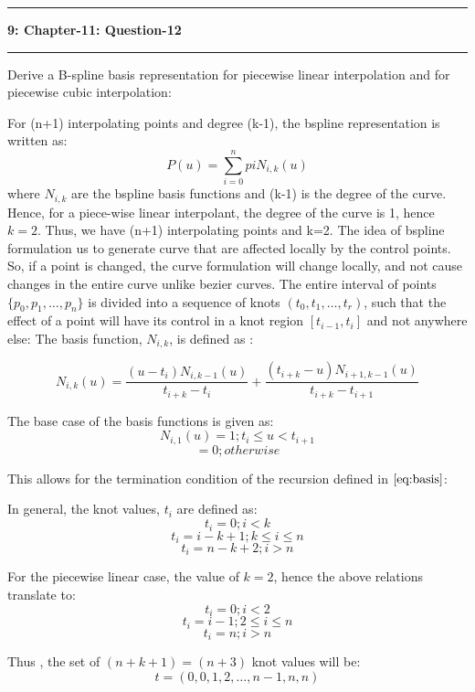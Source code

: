 \documentclass{article}
\newcommand\question[2]{\vspace{.25in}\hrule\textbf{#1: #2}\hrule\vspace{.10in}}
\begin{document}
 \question{9}{Chapter-11: Question-12}
Derive a B-spline basis representation for piecewise linear interpolation and for piecewise cubic interpolation: \newline

For (n+1) interpolating  points and degree (k-1), the bspline representation is written as: \newline
\begin{equation}
  P(u) = \sum_{i=0}^n pi N_{i,k}(u)
  \label{eq:bsum}
\end{equation}
 where $N_{i,k}$ are the bspline basis functions and (k-1) is the degree of the curve. Hence, for a piece-wise linear interpolant, the degree of the curve is 1, hence $k=2$. Thus, we have (n+1) interpolating points and k=2. \newline
The idea of bspline formulation us to  generate curve that are affected locally by the control points. So, if a point is changed, the curve formulation will change locally, and not cause changes in the entire curve unlike bezier curves. The entire interval of points $\{ p_0, p_1, \dots, p_n\}$ is divided into a sequence of knots $(t_0, t_1, \dots, t_r)$, such that the effect of a point will have its control in a knot region $[t_{i-1}, t_i]$ and not anywhere else: \newline
The basis function, $N_{i,k}$, is defined as :\newline

\begin{equation}
   N_{i,k}(u) = \dfrac{(u - t_i) N_{i,k-1}(u)}{t_{i+k} - t_i} + \dfrac{(t_{i+k} - u)N_{i+1,k-1}(u)}{t_{i+k} - t_{i+1}}
  \label{eq:basis}
\end{equation}

The base case of the basis functions is given as:
\[ N_{i,1}(u) = 1; t_i \leq u < t_{i+1}\]
\[ = 0 ; otherwise\]

This allows for the termination condition of the recursion defined in $\eqref{eq:basis}$: \newline

In general, the knot values, $t_i$ are defined as: \newline
\[ t_i = 0; i < k\]
\[ t_i = i-k+1; k \leq i \leq n\]
\[ t_i = n-k+2; i > n\]

For the piecewise linear case, the value of $k=2$, hence the above relations translate to: 
\[ t_i = 0; i < 2\]
\[ t_i = i-1; 2 \leq i \leq n\]
\[ t_i = n; i > n\]

Thus , the set of $(n+k+1) = (n+3)$ knot values will be: \newline
\[ t = (0,0,1,2, \dots, n-1, n,n)\]
\end{document}
